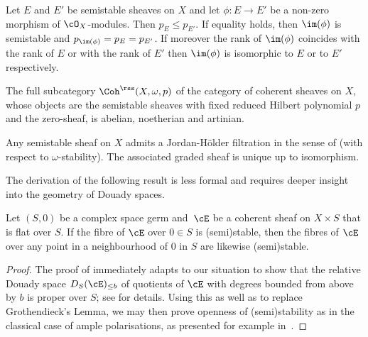 \begin{lemma}\label{lem:morphisms}
Let $E$ and $E'$ be semistable sheaves on $X$ and let $\phi :E\to E' $ be a non-zero morphism of $\cO_X$-modules. Then $p_E\le p_{E'}$. If equality holds, then $\im(\phi)$ is semistable and $p_{\im(\phi)}=p_E= p_{E'}$. If moreover the rank of $\im(\phi)$ coincides with the rank of $E$ or with the rank of $E'$ then $\im(\phi)$ is isomorphic to $E$ or to $E'$ respectively.
\end{lemma}

\begin{Prop}
\label{prop:abelian_category}
The full subcategory $\Coh^{{\rss}}{(X,\omega,p)}$ of the category of coherent sheaves on $X$, whose objects are the semistable sheaves with fixed reduced Hilbert polynomial $p$ and the zero-sheaf, is abelian, noetherian and artinian.
\end{Prop}

\begin{Prop}\label{prop:JH}
Any semistable sheaf on $X$ admits a Jordan-Hölder filtration in the sense of \cite[Def.\,1.5.1]{HL} (with respect to $\omega$-stability). The associated graded sheaf is unique up to isomorphism.
\end{Prop}

The derivation of the following result is less formal and requires deeper insight into the geometry of Douady spaces.

\begin{thm}\label{thm:openness-semistability}
Let $(S,0)$ be a complex space germ and~$\cE$ be a coherent sheaf on $X\times S$ that is flat over $S$. If the fibre of $\cE$ over $0\in S$ is (semi)stable, then the fibres of $\cE$ over any point in a neighbourhood of $0$ in $S$ are likewise (semi)stable.
\end{thm}

\begin{proof}
The proof of \cite[Cor.\,5.3]{TomaLimitareaI} immediately adapts to our situation to show that the relative Douady space $D_S(\cE)_{\le b}$ of quotients of $\cE$ with
degrees bounded from above by $b$ is proper over $S$; see \cite{TomaLimitareaII} for details. Using this as well as \cite[Lem.\,4.3]{TomaLimitareaI} to replace Grothendieck's Lemma, we may then prove openness of (semi)stability as in the classical case of ample polarisations, as presented for example in~\cite[Prop.\,2.3.1]{HL}.
\end{proof}

